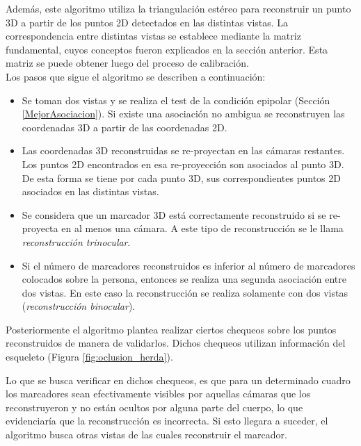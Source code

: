 Además, este algoritmo utiliza la triangulación estéreo para reconstruir un punto 3D a partir de los puntos 2D detectados en las distintas vistas. La correspondencia entre distintas vistas se establece mediante la matriz fundamental, cuyos conceptos fueron explicados en la sección anterior. Esta matriz se puede obtener luego del proceso de calibración.\\

Los pasos que sigue el algoritmo se describen a continuación:\

\begin{itemize}
\item Se toman dos vistas y se realiza el test de la condición epipolar (Sección \ref{MejorAsociacion}). Si existe una asociación no ambigua se reconstruyen  las coordenadas 3D a partir de las coordenadas 2D.

\item Las coordenadas 3D reconstruidas se re-proyectan en las cámaras restantes. Los puntos 2D encontrados en esa re-proyección son asociados al punto 3D. De esta forma se tiene por cada punto 3D, sus correspondientes puntos 2D asociados en las distintas vistas.\

\item Se considera que un marcador 3D está correctamente reconstruido si se re-proyecta en al menos una cámara. A este tipo de reconstrucción se le llama \textit{reconstrucción trinocular}.

\item Si el número de marcadores reconstruidos es inferior al número de marcadores colocados sobre la persona, entonces se realiza una segunda asociación entre dos vistas. En este caso la reconstrucción se realiza solamente con dos vistas (\textit{reconstrucción binocular}).\\

\end{itemize}

Posteriormente el algoritmo plantea realizar ciertos chequeos sobre los puntos reconstruidos de manera de validarlos. Dichos chequeos utilizan información del esqueleto (Figura \ref{fig:oclusion_herda}).


Lo que se busca verificar en dichos chequeos, es que para un determinado cuadro los marcadores sean efectivamente visibles por aquellas cámaras que los reconstruyeron y no están ocultos por alguna parte del cuerpo, lo que evidenciaría que la reconstrucción es incorrecta. Si esto llegara a suceder, el algoritmo busca otras vistas de las cuales reconstruir el marcador.

